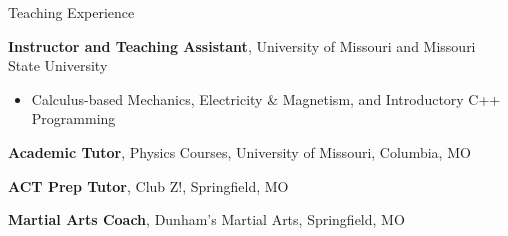 \begin{rubric}{Teaching Experience}

  \entry*[2018--2023]%
    \textbf{Instructor and Teaching Assistant}, University of Missouri and Missouri State University \RMPbadge\par
    \begin{itemize}
      \item Calculus-based Mechanics, Electricity \& Magnetism, and Introductory C++ Programming
    \end{itemize}

  \entry*[2021--Present]%
    \textbf{Academic Tutor}, Physics Courses, University of Missouri, Columbia, MO

  \entry*[2018--2021]%
    \textbf{ACT Prep Tutor}, Club Z!, Springfield, MO

  \entry*[2014--2020]%
    \textbf{Martial Arts Coach}, Dunham’s Martial Arts, Springfield, MO
\end{rubric}

